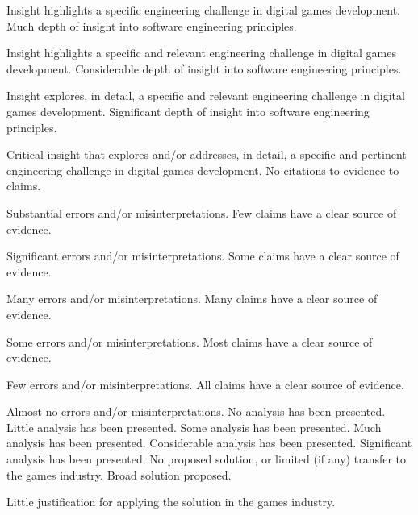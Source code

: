 \documentclass{../../../fal_assignment}
\begin{document}
\begin{markingrubric}
        \par 		Insight highlights a specific engineering challenge in digital games development.
        \grade 		Much depth of insight into software engineering principles.
        \par 		Insight highlights a specific and relevant engineering challenge in digital games development.
        \grade 		Considerable depth of insight into software engineering principles.
        \par 		Insight explores, in detail, a specific and relevant engineering challenge in digital games development.
        \grade 		Significant depth of insight into software engineering principles.
        \par 		Critical insight that explores and/or addresses, in detail, a specific and pertinent engineering challenge in digital games development.
%
        \grade\fail 	No citations to evidence to claims.
        \par 		Substantial errors and/or misinterpretations.
        \grade 		Few claims have a clear source of evidence.
        \par 		Significant errors and/or misinterpretations.
        \grade 		Some claims have a clear source of evidence.
        \par 		Many errors and/or misinterpretations.
        \grade 		Many claims have a clear source of evidence.
        \par 		Some errors and/or misinterpretations.
        \grade 		Most claims have a clear source of evidence.
        \par 		Few errors and/or misinterpretations.
        \grade 		All claims have a clear source of evidence.
        \par 		Almost no errors and/or misinterpretations.
%
        \grade\fail 	No analysis has been presented.
        \grade 		Little analysis has been presented.
        \grade 		Some analysis has been presented. 
        \grade 		Much analysis has been presented.
        \grade 		Considerable analysis has been presented.
        \grade 		Significant analysis has been presented.
%
        \grade\fail 	No proposed solution, or limited (if any) transfer to the games industry.
        \grade 		Broad solution proposed. 
        \par 		Little justification for applying the solution in the games industry.

\end{markingrubric}
\end{document}
